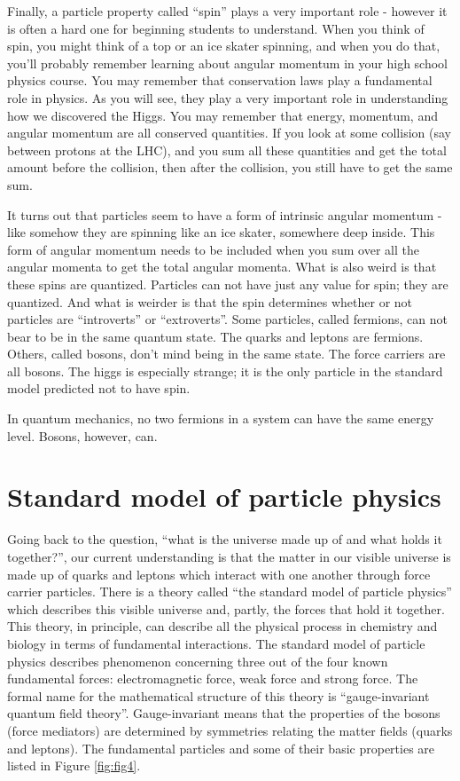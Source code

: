 \noindent
Finally, a particle property called ``spin'' plays a very important role -  however it is often a hard one for beginning students to understand.
When you think of spin, you might think of a top or an ice skater spinning, and when you do that, you'll probably remember learning about angular momentum in your high school physics course.  You may remember that conservation laws play a fundamental role in physics.  As you will see, they play a very important role in understanding how we discovered the Higgs.  You may remember that energy, momentum, and angular momentum are all conserved quantities.  If you look at some collision (say between protons at the LHC), and you sum all these quantities and get the total amount before the collision, then after the collision, you still have to get the same sum.  

It turns out that particles seem to have a form of intrinsic angular momentum -  like somehow they are spinning like an ice skater, somewhere deep inside. This form of angular momentum needs to be included when you sum over all the angular momenta to get the total angular momenta.  What is also weird is that these spins are quantized.  Particles can not have just any value for spin; they are quantized.  And what is weirder is that the spin determines whether or not particles are ``introverts'' or ``extroverts''.  Some particles, called fermions, can not bear to be in the same quantum state.  The quarks and leptons are fermions.  Others, called bosons, don't mind being in the same state.  The force carriers are all bosons.  The higgs is especially strange; it is the only particle in the standard model predicted not to have spin.


In quantum mechanics, no two fermions in a system can have the same energy level.  Bosons, however, can.


\section{Standard model of particle physics}
Going back to the question, ``what is the universe made up of and what holds it together?'', 
our current understanding is that the matter in our visible universe is made up of quarks and leptons which interact with one another through force carrier particles.  There is a theory called ``the standard model of particle physics'' which describes this visible universe and, partly, the forces that hold it together. This theory, in principle, can describe all the physical process in chemistry and biology in terms of fundamental interactions. The standard model of particle physics describes phenomenon concerning three out of the four known 
fundamental forces: electromagnetic force, weak force and strong force. The formal name for the mathematical structure of this theory is “gauge-invariant quantum field theory”.  Gauge-invariant means that the properties of the bosons (force mediators) are determined by symmetries relating the matter fields (quarks and leptons). 
The fundamental particles and some of their basic properties are listed in 
Figure \ref{fig:fig4}.





